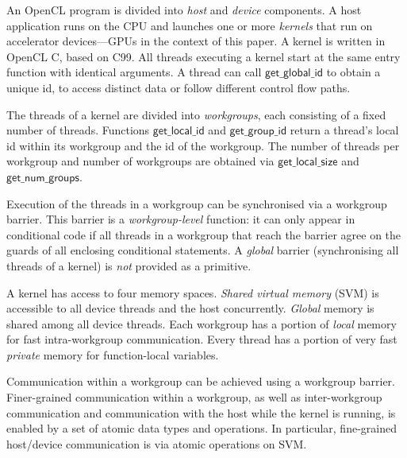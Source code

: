 \documentclass[parskip=half,sigconf,review, anonymous=true, acmcopyrightmode=none]{acmart}
\newcommand{\getgroupid}{\mathsf{get\_group\_id}}
\newcommand{\getnumgroups}{\mathsf{get\_num\_groups}}
\newcommand{\getlocalid}{\mathsf{get\_local\_id}}
\newcommand{\getglobalid}{\mathsf{get\_global\_id}}
\newcommand{\getlocalsize}{\mathsf{get\_local\_size}}
\newcommand{\getglobalsize}{\mathsf{get\_global\_size}}
\begin{document}
An OpenCL program is divided into \emph{host} and \emph{device}
components.  A host application runs on the CPU and launches one or
more \emph{kernels} that run on accelerator devices---GPUs in the
context of this paper.  A kernel is written in OpenCL C, based on C99.
All threads executing a kernel start at the same entry function with
identical arguments.  A thread can call $\getglobalid$
to obtain a unique id, to access distinct data or follow different control flow paths.

The threads of a kernel are divided into \emph{workgroups}, each consisting of a fixed number of threads.  Functions
$\getlocalid$ and $\getgroupid$ return a thread's local id within
its workgroup and the id of the workgroup.
%
%
The number
of threads per workgroup and number of workgroups are obtained via
$\getlocalsize$ and $\getnumgroups$.

Execution of the threads in a workgroup can be synchronised via a
workgroup barrier. This barrier is a \emph{workgroup-level} function:
it can only appear in conditional code if all threads in a workgroup
that reach the barrier agree on the guards of all enclosing
conditional statements.  A \emph{global} barrier (synchronising all
threads of a kernel) is \emph{not} provided as a primitive.

 A kernel has access to
four memory spaces.  \emph{Shared virtual memory} (SVM) is accessible
to all device threads and the host concurrently.  \emph{Global} memory is
shared among all device threads.  Each workgroup has a
portion of \emph{local} memory for fast intra-workgroup communication.
Every thread has a portion of very fast \emph{private} memory for
function-local variables.

Communication within a workgroup can be achieved
using a workgroup barrier.  Finer-grained
communication within a workgroup, as well as inter-workgroup
communication and communication with the host while the kernel is
running, is enabled by a set of atomic data types and operations.  In
particular, fine-grained host/device communication is via atomic
operations on SVM.
\end{document}
